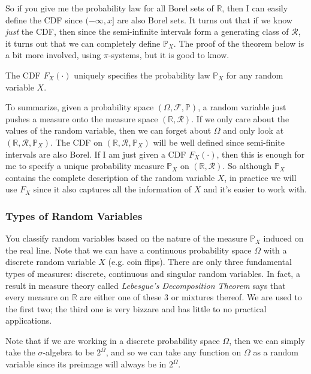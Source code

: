 \documentclass{article}
\begin{document}
      So if you give me the probability law for all Borel sets of $\mathbb{R}$, then I can easily define the CDF since $(-\infty, x]$ are also Borel sets. It turns out that if we know \textit{just} the CDF, then since the semi-infinite intervals form a generating class of $\mathcal{R}$, it turns out that we can completely define $\mathbb{P}_X$. The proof of the theorem below is a bit more involved, using $\pi$-systems, but it is good to know. 

      \begin{theorem}
        The CDF $F_X (\cdot)$ uniquely specifies the probability law $\mathbb{P}_X$ for any random variable $X$. 
      \end{theorem}

      To summarize, given a probability space $(\Omega, \mathcal{F}, \mathbb{P})$, a random variable just pushes a measure onto the measure space $(\mathbb{R}, \mathcal{R})$. If we only care about the values of the random variable, then we can forget about $\Omega$ and only look at $(\mathbb{R}, \mathcal{R}, \mathbb{P}_X)$. The CDF on $(\mathbb{R}, \mathcal{R}, \mathbb{P}_X)$ will be well defined since semi-finite intervals are also Borel. If I am just given a CDF $F_X (\cdot)$, then this is enough for me to specify a unique probability measure $\mathbb{P}_X$ on $(\mathbb{R}, \mathcal{R})$. So although $\mathbb{P}_X$ contains the complete description of the random variable $X$, in practice we will use $F_X$ since it also captures all the information of $X$ and it's easier to work with. 

    \subsubsection{Types of Random Variables}

      You classify random variables based on the nature of the measure $\mathbb{P}_X$ induced on the real line. Note that we can have a continuous probability space $\Omega$ with a discrete random variable $X$ (e.g. coin flips). There are only three fundamental types of measures: discrete, continuous and singular random variables. In fact, a result in measure theory called \textit{Lebesgue's Decomposition Theorem} says that every measure on $\mathbb{R}$ are either one of these 3 or mixtures thereof. We are used to the first two; the third one is very bizzare and has little to no practical applications. 

      Note that if we are working in a discrete probability space $\Omega$, then we can simply take the $\sigma$-algebra to be $2^\Omega$, and so we can take any function on $\Omega$ as a random variable since its preimage will always be in $2^\Omega$. 
\end{document}
